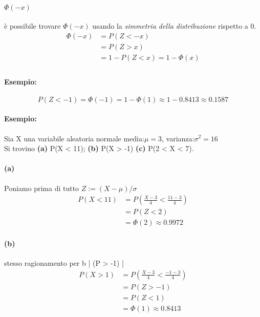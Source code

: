 \documentclass[]{article}
\begin{document}
    \paragraph{$\Phi(-x)$} è possibile trovare $\Phi(-x)$ usando la \textit{simmetria della distribuzione} rispetto a 0. \\
    \begin{equation*}
        \begin{split}
            \Phi(-x) &= P(Z < -x) \\
            &= P(Z > x) \\
            &= 1 - P(Z < x) = 1 - \Phi(x) \\
        \end{split}
    \end{equation*}
    \paragraph{Esempio:}
    \[ P(Z < -1) = \Phi(-1) = 1 -\Phi(1) \approx 1 - 0.8413 \approx 0.1587 \]
    
    \paragraph{Esempio:} Sia X una variabile aleatoria normale media:$\mu = 3$, varianza:$\sigma^2 = 16$ \\
    Si trovino \textbf{(a)} P(X < 11); \textbf{(b)} P(X > -1) \textbf{(c)} P(2 < X < 7).
    \paragraph{(a)} Poniamo prima di tutto $Z := (X - \mu) / \sigma$ 
    \begin{equation*}
        \begin{split}
            P(X < 11) &= P(\frac{X - 3}{4} < \frac{11 - 3}{4}) \\
            &= P(Z < 2) \\
            &= \Phi(2) \approx 0.9972
        \end{split}
    \end{equation*}

    \paragraph{(b)} stesso ragionamento per b | (P > -1) |
    \begin{equation*}
        \begin{split}
            P(X > 1) &= P(\frac{X - 3}{4} < \frac{-1 - 3}{4}) \\
            &= P(Z > -1) \\
            &= P(Z < 1) \\
            &= \Phi(1) \approx 0.8413
        \end{split}
    \end{equation*}
\end{document}
